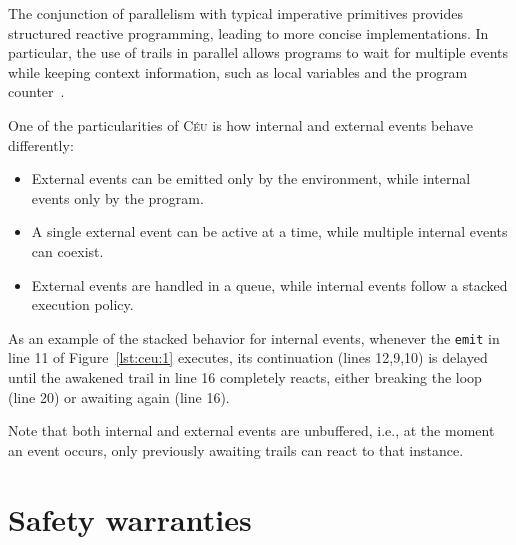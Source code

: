 \documentclass[preprint]{sigplanconf}
\newcommand{\CEU}{\textsc{C\'{e}u}\xspace}
\newcommand{\code}[1] {{\small{\texttt{#1}}}}
\newcommand{\1}{\;}
\newcommand{\2}{\;\;}
\newcommand{\3}{\;\;\;}
\newcommand{\5}{\;\;\;\;\;}
\begin{document}
The conjunction of parallelism with typical imperative primitives provides 
structured reactive programming, leading to more concise implementations.
In particular, the use of trails in parallel allows programs to wait for 
multiple events while keeping context information, such as local variables and 
the program counter~\cite{sync_async.cooperative}.

One of the particularities of \CEU is how internal and external events behave 
differently:

\begin{itemize}
\item External events can be emitted only by the environment, while internal 
events only by the program.
\item A single external event can be active at a time, while multiple internal 
events can coexist.
\item External events are handled in a queue, while internal events follow a 
stacked execution policy.
\end{itemize}


As an example of the stacked behavior for internal events, whenever the 
\code{emit} in line 11 of Figure~\ref{lst:ceu:1} executes, its continuation 
(lines 12,9,10) is delayed until the awakened trail in line 16 completely 
reacts, either breaking the loop (line 20) or awaiting again (line 16).

Note that both internal and external events are unbuffered, i.e., at the moment 
an event occurs, only previously awaiting trails can react to that instance.





\section{Safety warranties}
\label{sec.safety}
\end{document}
